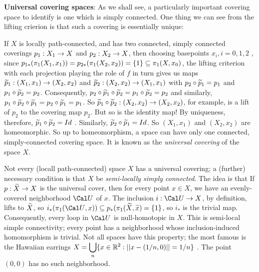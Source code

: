 \bsk

{\bf Universal covering spaces}: As we shall see, a particularly
important covering space to identify is one which is simply
connected. One thing we can see from the lifting crierion is
that such a covering is essentially unique:

\msk

If $X$ is locally path-connected, and has two connected, simply connected
coverings $p_1:X_1\rightarrow X$ and $p_2:X_2\rightarrow X$, then choosing
basepoints $x_i, i=0,1,2$ , since 
$p_{1*}(\pi_1(X_1,x_1)) = p_{2*}(\pi_1(X_2,x_2))=\{1\}\subseteq \pi_1(X,x_0)$,
the lifting criterion with each projection playing the role of $f$ in turn
gives us maps $\widetilde{p}_1:(X_1,x_1)\rightarrow (X_2,x_2)$ and 
$\widetilde{p}_2:(X_2,x_2)\rightarrow (X_1,x_1)$ with $p_2\circ\widetilde{p}_1=p_1$
and $p_1\circ\widetilde{p}_2=p_2$. Consequently, 
$p_2\circ\widetilde{p}_1\circ \widetilde{p}_2 = p_1\circ\widetilde{p}_2=p_2$
and similarly, 
$p_1\circ\widetilde{p}_2\circ \widetilde{p}_1 =p_2\circ\widetilde{p}_1=p_1$.
So $\widetilde{p}_1\circ \widetilde{p}_2:(X_2,x_2)\rightarrow (X_2,x_2)$, for example,
is a lift of $p_2$ to the covering map $p_2$. But so is the identity map! By
uniqueness, therefore, $\widetilde{p}_1\circ \widetilde{p}_2=Id$ . Similarly,
$\widetilde{p}_2\circ \widetilde{p}_1=Id$. So $(X_1,x_1)$ and $(X_2,x_2)$ 
are homeomorphic. So up to homeomorphism, a space can have
only one connected, simply-connected covering space. It is known
as the {\it universal covering} of the space $X$. 

\msk

Not every (locall path-connected) space $X$ has a universal covering; a 
(further) necessary condition is that $X$ be {\it semi-locally simply connected}.
The idea is that If $p:\widetilde{X}\rightarrow X$ is the universal cover, then for every 
point $x\in X$, we have an evenly-covered neighborhood ${\Cal U}$ of $x$.
The inclusion $i:{\Cal U}\ra X$, by definition, lifts to $\widetilde{X}$, so
$i_*(\pu({\Cal U},x))\sset p_*(\pu(\wtl{X},\wtl{x}) = \{1\}$, so
$i_*$ is the trivial map. Consequently, every loop in ${\Cal U}$ is 
null-homotopic in $X$. This is semi-local simple connectivity;
every point has a neighborhood whose inclusion-induced homomorphism
is trivial. Not all spaces have this property; the most famous is the 
Hawaiian earrings 
$\displaystyle X=\bigcup_{n}\{x\in {\Bbb R}^2 :  ||x-(1/n,0)||=1/n\}$ .
The point $(0,0)$ has no such neighborhood. 

\bsk


